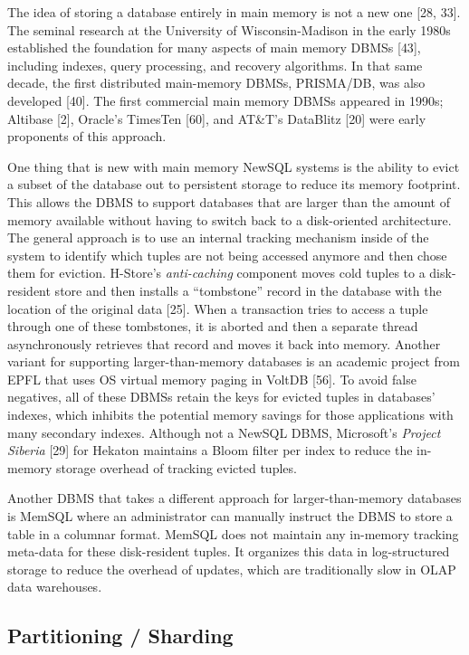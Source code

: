 \documentclass[a4paper,12pt,notitlepage,twoside,openright]{article}
\begin{document}
The idea of storing a database entirely in main memory is not a new one
{[}28, 33{]}. The seminal research at the University of
Wisconsin-Madison in the early 1980s established the foundation for many
aspects of main memory DBMSs {[}43{]}, including indexes, query
processing, and recovery algorithms. In that same decade, the first
distributed main-memory DBMSs, PRISMA/DB, was also developed {[}40{]}.
The first commercial main memory DBMSs appeared in 1990s; Altibase
{[}2{]}, Oracle's TimesTen {[}60{]}, and AT\&T's DataBlitz {[}20{]} were
early proponents of this approach.

One thing that is new with main memory NewSQL systems is the ability to
evict a subset of the database out to persistent storage to reduce its
memory footprint. This allows the DBMS to support databases that are
larger than the amount of memory available without having to switch back
to a disk-oriented architecture. The general approach is to use an
internal tracking mechanism inside of the system to identify which
tuples are not being accessed anymore and then chose them for eviction.
H-Store's \emph{anti-caching} component moves cold tuples to a
disk-resident store and then installs a ``tombstone'' record in the
database with the location of the original data {[}25{]}. When a
transaction tries to access a tuple through one of these tombstones, it
is aborted and then a separate thread asynchronously retrieves that
record and moves it back into memory. Another variant for supporting
larger-than-memory databases is an academic project from EPFL that uses
OS virtual memory paging in VoltDB {[}56{]}. To avoid false negatives,
all of these DBMSs retain the keys for evicted tuples in databases'
indexes, which inhibits the potential memory savings for those
applications with many secondary indexes. Although not a NewSQL DBMS,
Microsoft's \emph{Project Siberia} {[}29{]} for Hekaton maintains a
Bloom filter per index to reduce the in-memory storage overhead of
tracking evicted tuples.

Another DBMS that takes a different approach for larger-than-memory
databases is MemSQL where an administrator can manually instruct the
DBMS to store a table in a columnar format. MemSQL does not maintain any
in-memory tracking meta-data for these disk-resident tuples. It
organizes this data in log-structured storage to reduce the overhead of
updates, which are traditionally slow in OLAP data warehouses.

\hypertarget{partitioning-sharding}{%
\subsection{Partitioning / Sharding}\label{partitioning-sharding}}
\end{document}
